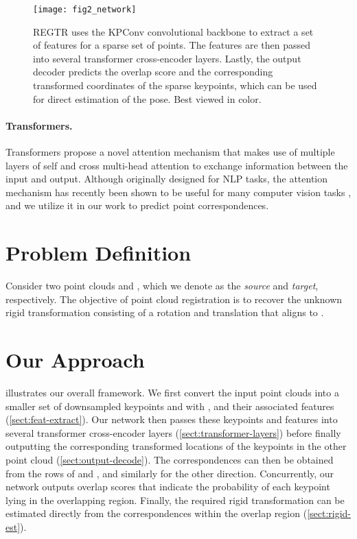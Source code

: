 \documentclass[10pt,twocolumn,letterpaper]{article}
\begin{document}
\begin{figure*}[t]
    \centering
    \texttt{[image: fig2\_network]}
    \caption{REGTR uses the KPConv convolutional backbone to extract a set of features for a sparse set of points. The features are then passed into several transformer cross-encoder layers. Lastly, the output decoder predicts the overlap score and the corresponding transformed coordinates of the sparse keypoints, which can be used for direct estimation of the pose. Best viewed in color.}
    \label{fig:network}
\end{figure*}

\vspace{-4.2mm}
\paragraph{Transformers.}
Transformers \cite{vaswani2017attention} propose a novel attention mechanism that makes use of multiple layers of self and cross multi-head attention to exchange information between the input and output. Although originally designed for NLP tasks, the attention mechanism has recently been shown to be useful for many computer vision tasks \cite{carion2020detr,misra2021-3detr,dosovitskiy2020vit,yu2021pointr}, and we utilize it in our work to predict point correspondences. 

\section{Problem Definition}
Consider two point clouds  and , which we denote as the \emph{source} and \emph{target}, respectively. The objective of point cloud registration is to recover the unknown rigid transformation consisting of a rotation  and translation  that aligns  to .


\section{Our Approach}
 illustrates our overall framework.
We first convert the input point clouds into a smaller set of downsampled keypoints  and  with , and their associated features  (\cref{sect:feat-extract}). Our network then passes these keypoints and features into several transformer cross-encoder layers (\cref{sect:transformer-layers}) before finally outputting the corresponding transformed locations  of the keypoints in the other point cloud (\cref{sect:output-decode}).
The correspondences can then be obtained from the rows of  and , \ie  and similarly for the other direction.
Concurrently, our network outputs overlap scores  that indicate the probability of each keypoint lying in the overlapping region. 
Finally, the required rigid transformation can be estimated directly from the correspondences within the overlap region (\cref{sect:rigid-est}). 
\end{document}
